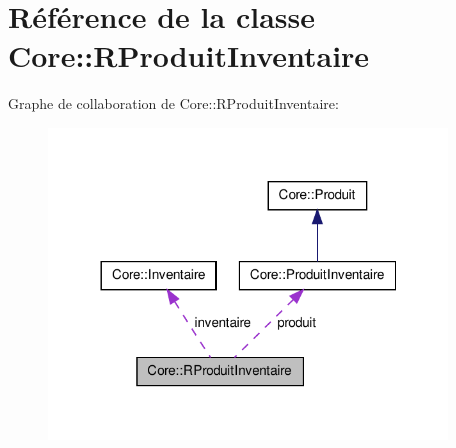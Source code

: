 \hypertarget{class_core_1_1_r_produit_inventaire}{
\section{Référence de la classe Core::RProduitInventaire}
\label{d0/de7/class_core_1_1_r_produit_inventaire}
}


Graphe de collaboration de Core::RProduitInventaire:\nopagebreak
\begin{figure}[H]
\begin{center}
\leavevmode
\includegraphics[width=300pt]{d3/d23/class_core_1_1_r_produit_inventaire__coll__graph}
\end{center}
\end{figure}
